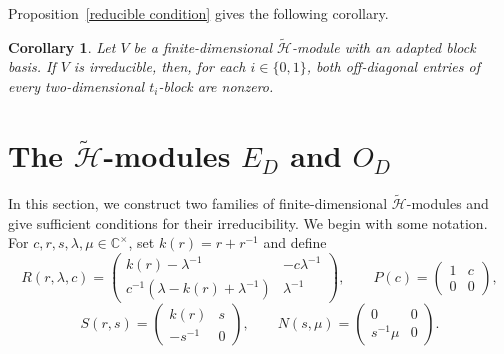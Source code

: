 \documentclass[reqno]{amsart}
\newtheorem{corollary}[theorem]{Corollary}
\theoremstyle{definition}
\begin{document}
Proposition~\ref{reducible condition} gives the following corollary.


\begin{corollary}\label{irreducible condition}
%
Let $V$ be a finite-dimensional $\widetilde{\mathcal H}$-module with an
adapted block basis.
If $V$ is irreducible, then, for each $i\in\{0,1\}$, both off-diagonal
entries of every two-dimensional $t_i$-block are nonzero.
%
\end{corollary}




\section{The $\widetilde{\mathcal{H}}$-modules $E_D$ and $O_D$}\label{Sec:ED,OD}




In this section, we construct two families of finite-dimensional 
$\widetilde{\mathcal{H}}$-modules and give sufficient conditions for their 
irreducibility. 
We begin with some notation.
For $c,r,s,\lambda,\mu \in \mathbb{C}^{\times}$, set $k(r)=r+r^{-1}$ and define
\begin{equation}
R(r,\lambda,c)=
\begin{pmatrix}
k(r)-\lambda^{-1}&-c\lambda^{-1}\\
c^{-1}(\lambda-k(r)+\lambda^{-1})&\lambda^{-1}
\end{pmatrix},
\qquad
P(c)=
\begin{pmatrix}
1&c\\
0&0
\end{pmatrix},
\label{local block R}
\end{equation}
\begin{equation}
S(r,s)=
\begin{pmatrix}
k(r)&s\\
-s^{-1}&0
\end{pmatrix},
\qquad
N(s,\mu)=
\begin{pmatrix}
0&0\\
s^{-1}\mu&0
\end{pmatrix}.
\label{local blocks PSN}
\end{equation}
\end{document}
